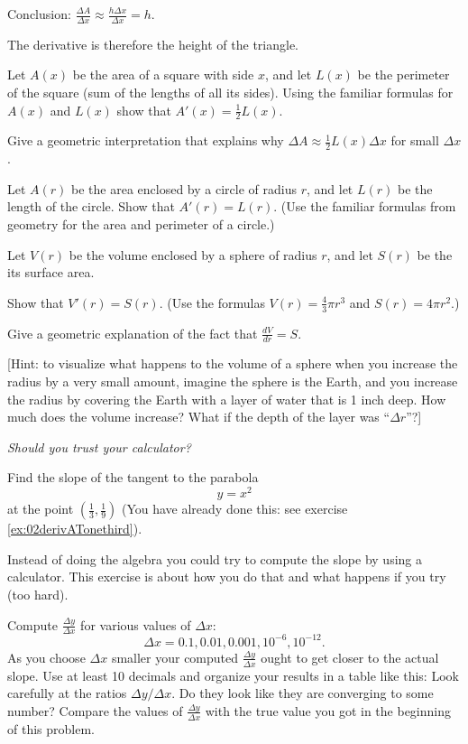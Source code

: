\begin{multicols}{2}
Conclusion: $\displaystyle \frac{\Delta A}{\Delta x}
\approx\frac{h\Delta x}{\Delta x} = h$.

The derivative is therefore the height of the triangle.

\endanswer


\problem \groupproblem Let $A(x)$ be the area of a square with
side $x$, and let $L(x)$ be
the perimeter of the square (sum of the lengths of all its sides).
Using the familiar formulas for $A(x)$ and $L(x)$ show that $A'(x) =
\frac12 L(x)$.

Give a geometric interpretation that explains why $\Delta A \approx
\frac12 L(x) \Delta x$ for small $\Delta x$.


\problem Let $A(r)$ be the area enclosed by a circle of radius $r$, and let
$L(r)$ be the length of the circle.  Show that $ A'(r) = L(r) $.
(Use the familiar formulas from geometry for the area and perimeter
of a circle.)


\problem Let $V(r)$ be the volume enclosed by a sphere of radius $r$, and let
$S(r)$ be the its surface area.

\subprob Show that $V'(r) = S(r)$.  (Use the
formulas $V(r) = \frac43\pi r^3$ and $S(r) = 4\pi r^2$.)

\subprob Give a geometric explanation of the fact that
$\frac{dV} {dr} = S$.

[Hint: to visualize what happens to the volume of a sphere when
you increase the radius by a very small amount, imagine  the sphere is
the Earth, and you increase the radius by covering the Earth with
a layer of water that is 1 inch deep.  How much does the volume
increase?  What if the depth of the layer was ``$\Delta r$''?]

\problem \label{ex:bad-calculator-bad} \groupproblem
\itshape Should you trust your calculator?\upshape

Find the slope of the tangent to the parabola
\[
y=x^2
\]
at the point
$(\frac13, \frac{1}{9})$ (You have already done this: see exercise
\ref{ex:02derivATonethird}).

Instead of doing the algebra you could try to compute the slope by
using a calculator.  This exercise is about how you do that and what
happens if you try (too hard).

Compute $\frac{\Delta y}{\Delta x}$ for various values of $\Delta x$:
\[
\Delta x = 0.1, 0.01, 0.001, 10^{-6}, 10^{-12}.
\]
As you choose $\Delta x$ smaller your computed $\frac{\Delta
  y}{\Delta x}$ ought to get closer to the actual slope.  Use at
least 10 decimals and organize your results in a table like this:
Look carefully at the ratios $\Delta y/\Delta x$.  Do they look like
they are converging to some number?  Compare the values of
$\frac{\Delta y}{\Delta x}$ with the true value you got in the
beginning of this problem.



\end{multicols}
\noproblemfont

